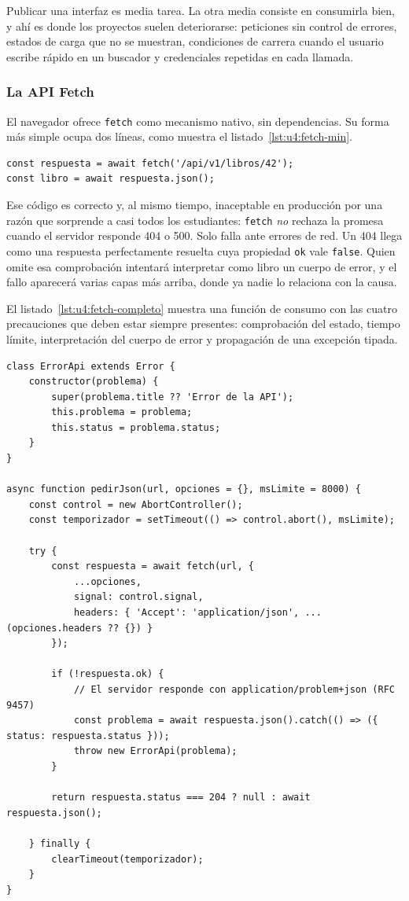 \documentclass[11pt,a4paper,openany]{book}
\begin{document}
Publicar una interfaz es media tarea. La otra media consiste en consumirla bien, y ahí es donde los proyectos suelen deteriorarse: peticiones sin control de errores, estados de carga que no se muestran, condiciones de carrera cuando el usuario escribe rápido en un buscador y credenciales repetidas en cada llamada.

\subsubsection{La API Fetch}

El navegador ofrece \texttt{fetch} como mecanismo nativo, sin dependencias. Su forma más simple ocupa dos líneas, como muestra el listado~\ref{lst:u4:fetch-min}.

\begin{lstlisting}[style=js,caption={Peticion GET minima con la API Fetch.},label={lst:u4:fetch-min}]
const respuesta = await fetch('/api/v1/libros/42');
const libro = await respuesta.json();
\end{lstlisting}

Ese código es correcto y, al mismo tiempo, inaceptable en producción por una razón que sorprende a casi todos los estudiantes: \texttt{fetch} \emph{no} rechaza la promesa cuando el servidor responde 404 o 500. Solo falla ante errores de red. Un 404 llega como una respuesta perfectamente resuelta cuya propiedad \texttt{ok} vale \texttt{false}. Quien omite esa comprobación intentará interpretar como libro un cuerpo de error, y el fallo aparecerá varias capas más arriba, donde ya nadie lo relaciona con la causa.

El listado~\ref{lst:u4:fetch-completo} muestra una función de consumo con las cuatro precauciones que deben estar siempre presentes: comprobación del estado, tiempo límite, interpretación del cuerpo de error y propagación de una excepción tipada.

\begin{lstlisting}[style=js,caption={Funcion de consumo con control de estado tiempo limite y error estructurado.},label={lst:u4:fetch-completo}]
class ErrorApi extends Error {
	constructor(problema) {
		super(problema.title ?? 'Error de la API');
		this.problema = problema;
		this.status = problema.status;
	}
}

async function pedirJson(url, opciones = {}, msLimite = 8000) {
	const control = new AbortController();
	const temporizador = setTimeout(() => control.abort(), msLimite);

	try {
		const respuesta = await fetch(url, {
			...opciones,
			signal: control.signal,
			headers: { 'Accept': 'application/json', ...(opciones.headers ?? {}) }
		});

		if (!respuesta.ok) {
			// El servidor responde con application/problem+json (RFC 9457)
			const problema = await respuesta.json().catch(() => ({ status: respuesta.status }));
			throw new ErrorApi(problema);
		}

		return respuesta.status === 204 ? null : await respuesta.json();

	} finally {
		clearTimeout(temporizador);
	}
}
\end{lstlisting}
\end{document}
